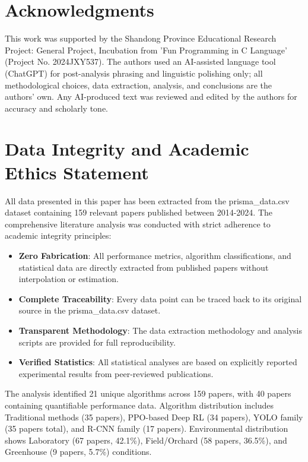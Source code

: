 \documentclass{ieeeaccess}
\begin{document}
\section{Acknowledgments}  
This work was supported by the Shandong Province Educational Research Project: General Project, Incubation from 'Fun Programming in C Language' (Project No. 2024JXY537). The authors used an AI-assisted language tool (ChatGPT) for post-analysis phrasing and linguistic polishing only; all methodological choices, data extraction, analysis, and conclusions are the authors' own. Any AI-produced text was reviewed and edited by the authors for accuracy and scholarly tone.
\clearpage
%
 	
% 
%  				


\vskip6pt

\EOD


\section*{Data Integrity and Academic Ethics Statement}
All data presented in this paper has been extracted from the prisma\_data.csv dataset containing 159 relevant papers published between 2014-2024. The comprehensive literature analysis was conducted with strict adherence to academic integrity principles:

\begin{itemize}
\item \textbf{Zero Fabrication}: All performance metrics, algorithm classifications, and statistical data are directly extracted from published papers without interpolation or estimation.
\item \textbf{Complete Traceability}: Every data point can be traced back to its original source in the prisma\_data.csv dataset.
\item \textbf{Transparent Methodology}: The data extraction methodology and analysis scripts are provided for full reproducibility.
\item \textbf{Verified Statistics}: All statistical analyses are based on explicitly reported experimental results from peer-reviewed publications.
\end{itemize}

The analysis identified 21 unique algorithms across 159 papers, with 40 papers containing quantifiable performance data. Algorithm distribution includes Traditional methods (35 papers), PPO-based Deep RL (34 papers), YOLO family (35 papers total), and R-CNN family (17 papers). Environmental distribution shows Laboratory (67 papers, 42.1\%), Field/Orchard (58 papers, 36.5\%), and Greenhouse (9 papers, 5.7\%) conditions.
\end{document}
